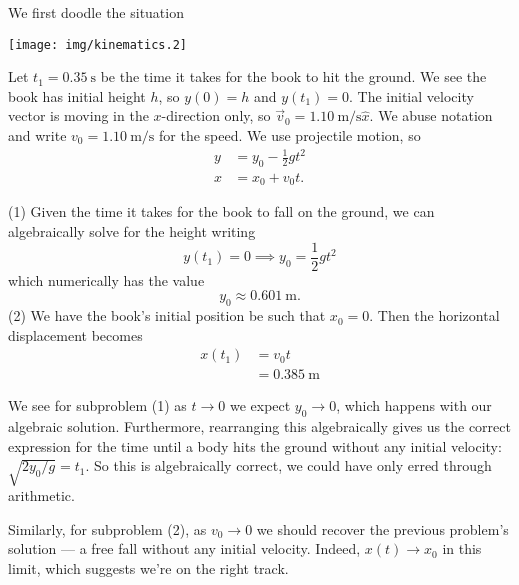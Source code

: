 \begin{soln}
  \IDandSETUP
We first doodle the situation
\begin{center}
\texttt{[image: img/kinematics.2]}
\end{center}
Let $t_{1}=\SI{0.35}{\second}$ be the time it takes for the book to hit
the ground. We see the book has initial height $h$, so $y(0)=h$ and
$y(t_{1})=0$. The initial velocity vector is moving in the $x$-direction
only, so $\vec{v}_{0}=\SI{1.10}{\meter\per\second}\hat{x}$. We abuse
notation and write $v_{0}=\SI{1.10}{\meter\per\second}$ for the speed. We use
projectile motion, so
\begin{equation*}
\begin{split}
y &= y_{0} - \frac{1}{2}gt^{2}\\
x &= x_{0} + v_{0}t.
\end{split}
\end{equation*}

\EXECUTE
(1) Given the time it takes for the book to fall on the
ground, we can algebraically solve for the height writing
\begin{equation}
y(t_{1})=0\implies y_{0}=\frac{1}{2}gt^{2}
\end{equation}
which numerically has the value
\begin{equation}
y_{0}\approx \SI{0.601}{\meter}.
\end{equation}
(2) We have the book's initial position be such that $x_{0}=0$. Then the
horizontal displacement becomes
\begin{equation}
\begin{split}
x(t_{1}) &= v_{0}t\\
&= \SI{0.385}{\meter}
\end{split}
\end{equation}

\EVALUATE
We see for subproblem (1) as $t\to0$ we expect $y_{0}\to0$, which
happens with our algebraic solution. Furthermore, rearranging this
algebraically gives us the correct expression for the time until a body
hits the ground without any initial velocity:
$\sqrt{2y_{0}/g}=t_{1}$. So this is algebraically correct, we could have
only erred through arithmetic.

Similarly, for subproblem (2), as $v_{0}\to0$ we should recover the
previous problem's solution --- a free fall without any initial
velocity. Indeed, $x(t)\to x_0$ in this limit, which suggests we're on
the right track.
\end{soln}


